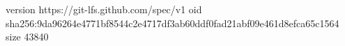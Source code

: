 version https://git-lfs.github.com/spec/v1
oid sha256:9da96264e4771bf8544c2e4717df3ab60ddf0fad21abf09e461d8efca65c1564
size 43840
